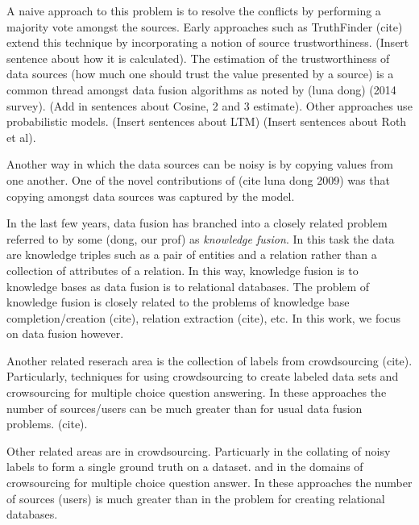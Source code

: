 \documentclass{acm_proc_article-sp}
\begin{document}
A naive approach to this problem is to resolve the conflicts by performing a majority vote amongst the sources. Early approaches such as {\sc TruthFinder} (cite)  extend this technique by incorporating a notion of source trustworthiness. (Insert sentence about how it is calculated). The estimation of the trustworthiness of data sources (how much one should trust the value presented by a source)  is a common thread amongst data fusion algorithms as noted by (luna dong) (2014 survey). (Add in sentences about Cosine, 2 and 3 estimate). Other approaches use probabilistic models. (Insert sentences about LTM) (Insert sentences about Roth et al).


Another way in which the data sources can be noisy is by copying values from one another. One of the novel contributions of (cite luna dong 2009) was that copying amongst data sources was captured by the model. 

In the last few years, data fusion has branched into a closely related problem referred to by some (dong, our prof) as \emph{knowledge fusion}. In this task the data are knowledge triples such as a pair of entities and a relation rather than a collection of attributes of a relation. In this way, knowledge fusion is to knowledge bases as data fusion is to relational databases. The problem of knowledge fusion is closely related to the problems of knowledge base completion/creation (cite), relation extraction (cite), etc. In this work, we focus on data fusion however.

Another related reserach area is the collection of labels from crowdsourcing (cite). Particularly, techniques for using crowdsourcing to create labeled data sets and crowsourcing for multiple choice question answering. In these approaches the number of sources/users can be much greater than for usual data fusion problems. (cite).



Other related areas are in crowdsourcing. Particuarly in the collating of noisy labels to form a single ground truth on a dataset. and in the domains of crowsourcing for multiple choice question answer. In these approaches the number of sources (users) is much greater than in the problem for creating relational databases.  


  

\balancecolumns
\end{document}
